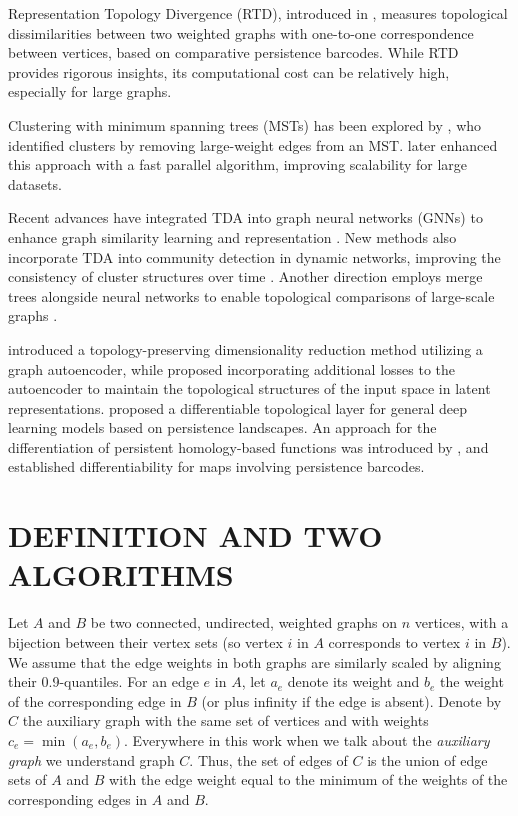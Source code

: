 \documentclass[twoside]{article}
\begin{document}
Representation Topology Divergence (RTD), introduced in \citet{barannikov2021representation}, measures topological dissimilarities between two weighted graphs with one-to-one correspondence between vertices, based on comparative persistence barcodes. While RTD provides rigorous insights, its computational cost can be relatively high, especially for large graphs. 

Clustering with minimum spanning trees (MSTs) has been explored by \citet{Zahn1971GestaltClusters}, who identified clusters by removing large-weight edges from an MST. \citet{Xu1990ParallelMSTClustering} later enhanced this approach with a fast parallel algorithm, improving scalability for large datasets.

Recent advances have integrated TDA into graph neural networks (GNNs) to enhance graph similarity learning and representation \citet{chen2021topological,wen2024tensor}. New methods also incorporate TDA into community detection in dynamic networks, improving the consistency of cluster structures over time \citep{kong2024learning}. Another direction employs merge trees alongside neural networks to enable topological comparisons of large-scale graphs \citep{qin2024rapid}.

 \cite{luo2021topology} introduced a topology-preserving dimensionality reduction method utilizing a graph autoencoder, while \cite{moor2020topological,trofimov2023learning} proposed  incorporating  additional losses to the autoencoder to maintain the topological structures of the input space in latent representations. 
\cite{kim2020pllay} proposed a differentiable topological layer for general deep learning models based on persistence landscapes. An approach for the differentiation of persistent homology-based functions was introduced by \cite{carriere2021optimizing}, and \cite{leygonie2021framework} established differentiability for maps involving persistence barcodes.

\section{DEFINITION AND TWO ALGORITHMS}
\label{sec:methodology}

Let \( A \) and \( B \) be two connected, undirected, weighted graphs on \( n \) vertices, with a bijection between their vertex sets (so vertex \( i \) in \( A \) corresponds to vertex \( i \) in \( B \)). We assume that the edge weights in both graphs are similarly scaled by aligning their 0.9-quantiles. For an edge \( e \) in \( A \), let \( a_e \) denote its weight and \( b_e \) the weight of the corresponding edge in \( B \) (or plus infinity if the edge is absent). Denote by   \( C \) the auxiliary graph with the same set of vertices and with weights \( c_e = \min(a_e, b_e) \). Everywhere in this work when we talk about the \textit{auxiliary graph} we understand graph \( C \). Thus,  the set of  edges of \( C \) is the union of edge sets of \( A \) and \( B \) with the edge weight equal to the minimum of the weights of the corresponding edges in \( A \) and \( B \).
\end{document}
